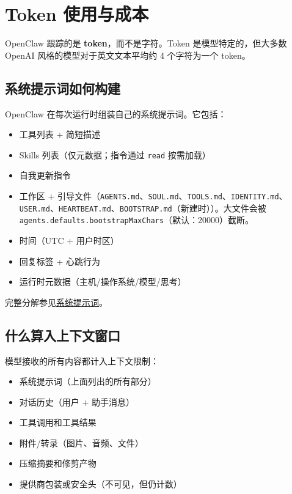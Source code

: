 \clearpage

\section{Token 使用与成本}


OpenClaw 跟踪的是 \textbf{token}，而不是字符。Token 是模型特定的，但大多数
OpenAI 风格的模型对于英文文本平均约 4 个字符为一个 token。

\subsection{系统提示词如何构建}


OpenClaw 在每次运行时组装自己的系统提示词。它包括：

\begin{itemize}
  \item 工具列表 + 简短描述
  \item Skills 列表（仅元数据；指令通过 \texttt{read} 按需加载）
  \item 自我更新指令
  \item 工作区 + 引导文件（\texttt{AGENTS.md}、\texttt{SOUL.md}、\texttt{TOOLS.md}、\texttt{IDENTITY.md}、\texttt{USER.md}、\texttt{HEARTBEAT.md}、\texttt{BOOTSTRAP.md}（新建时））。大文件会被 \texttt{agents.defaults.bootstrapMaxChars}（默认：20000）截断。
  \item 时间（UTC + 用户时区）
  \item 回复标签 + 心跳行为
  \item 运行时元数据（主机/操作系统/模型/思考）
\end{itemize}


完整分解参见\href{/concepts/system-prompt}{系统提示词}。

\subsection{什么算入上下文窗口}


模型接收的所有内容都计入上下文限制：

\begin{itemize}
  \item 系统提示词（上面列出的所有部分）
  \item 对话历史（用户 + 助手消息）
  \item 工具调用和工具结果
  \item 附件/转录（图片、音频、文件）
  \item 压缩摘要和修剪产物
  \item 提供商包装或安全头（不可见，但仍计数）
\end{itemize}


